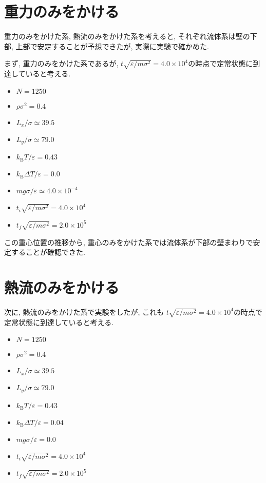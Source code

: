 \section{重力のみをかける}\label{sec:dT0}

重力のみをかけた系, 熱流のみをかけた系を考えると, それぞれ流体系は壁の下部, 上部で安定することが予想できたが, 実際に実験で確かめた. 

まず, 重力のみをかけた系であるが, $t \sqrt{\varepsilon / m \sigma^2}= 4.0 \times 10^4$の時点で定常状態に到達していると考える. 

\begin{itemize}
  \item $N = 1250$
  \item $\rho {\sigma}^2 = 0.4$
  \item $L_x / \sigma \simeq 39.5$
  \item $L_y / \sigma \simeq 79.0$
  \item $k_{\text{B}} T / \varepsilon = 0.43$
  \item $k_{\text{B}} \Delta T / \varepsilon = 0.0$
  \item $mg\sigma/\varepsilon \simeq 4.0 \times 10^{-4}$
  \item $t_i \sqrt{\varepsilon / m \sigma^2}= 4.0 \times 10^4$
  \item $t_f \sqrt{\varepsilon / m \sigma^2} = 2.0 \times 10^{5}$
\end{itemize}




この重心位置の推移から, 重心のみをかけた系では流体系が下部の壁まわりで安定することが確認できた. 

\section{熱流のみをかける}\label{sec:g0}

次に, 熱流のみをかけた系で実験をしたが, これも $t \sqrt{\varepsilon / m \sigma^2}= 4.0 \times 10^4$の時点で定常状態に到達していると考える. 

\begin{itemize}
  \item $N = 1250$
  \item $\rho {\sigma}^2 = 0.4$
  \item $L_x / \sigma \simeq 39.5$
  \item $L_y / \sigma \simeq 79.0$
  \item $k_{\text{B}} T / \varepsilon = 0.43$
  \item $k_{\text{B}} \Delta T / \varepsilon = 0.04$
  \item $mg\sigma/\varepsilon = 0.0$
  \item $t_i \sqrt{\varepsilon / m \sigma^2}= 4.0 \times 10^4$
  \item $t_f \sqrt{\varepsilon / m \sigma^2} = 2.0 \times 10^{5}$
\end{itemize}

